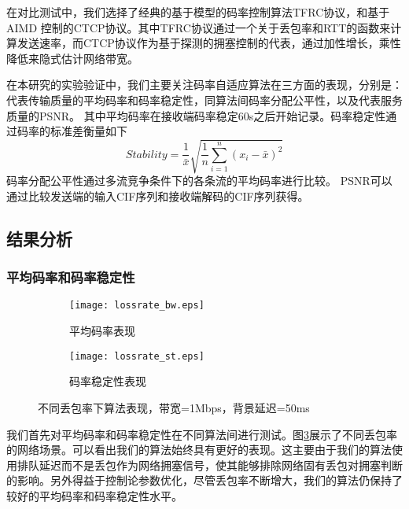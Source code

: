     在对比测试中，我们选择了经典的基于模型的码率控制算法TFRC协议，和基于AIMD 控制的CTCP协议。其中TFRC协议通过一个关于丢包率和RTT的函数来计算发送速率，而CTCP协议作为基于探测的拥塞控制的代表，通过加性增长，乘性降低来隐式估计网络带宽。

    在本研究的实验验证中，我们主要关注码率自适应算法在三方面的表现，分别是：代表传输质量的平均码率和码率稳定性，同算法间码率分配公平性，以及代表服务质量的PSNR。 其中平均码率在接收端码率稳定60s之后开始记录。码率稳定性通过码率的标准差衡量如下
    \begin{displaymath} \label{eq:throughput}
    Stability = \frac{1}{\bar{x}}\sqrt{ \frac{1}{n} \sum_{i=1}^{n}(x_i-\bar{x})^2 }
    \end{displaymath}
    码率分配公平性通过多流竞争条件下的各条流的平均码率进行比较。
    PSNR可以通过比较发送端的输入CIF序列和接收端解码的CIF序列获得。

    \subsection{结果分析}

        \subsubsection{平均码率和码率稳定性}

        \begin{figure}[htbp]
          \begin{subfigure}[b]{0.5\textwidth}
            \centering
            \texttt{[image: lossrate\_bw.eps]}
            \caption{平均码率表现}
            \label{pic:lossrate_bw}
          \end{subfigure}
          \begin{subfigure}[b]{0.5\textwidth}
            \centering
            \texttt{[image: lossrate\_st.eps]}
            \caption{码率稳定性表现}
            \label{pic:lossrate_st}
          \end{subfigure}
          \caption{不同丢包率下算法表现，带宽=1Mbps，背景延迟=50ms}
          \label{pic:lossrate}
        \end{figure}

        我们首先对平均码率和码率稳定性在不同算法间进行测试。图\ref{pic:lossrate}展示了不同丢包率的网络场景。可以看出我们的算法始终具有更好的表现。这主要由于我们的算法使用排队延迟而不是丢包作为网络拥塞信号，使其能够排除网络固有丢包对拥塞判断的影响。另外得益于控制论参数优化，尽管丢包率不断增大，我们的算法仍保持了较好的平均码率和码率稳定性水平。

